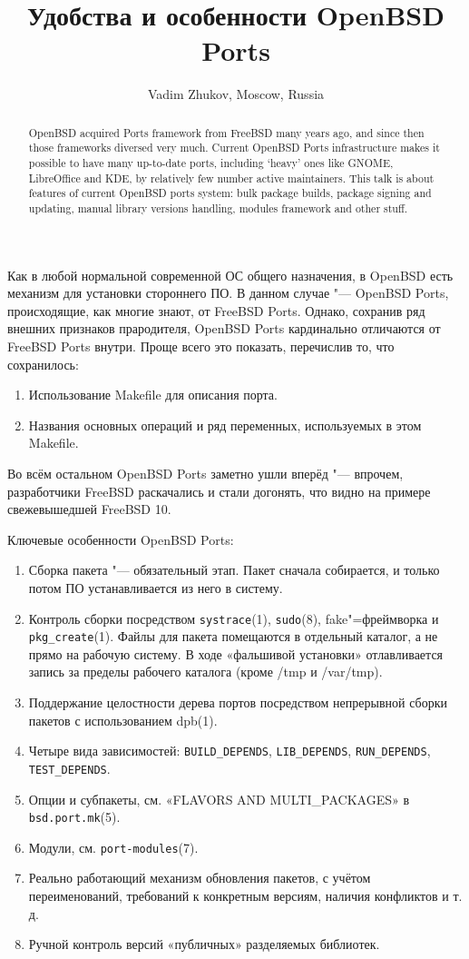 \documentclass[10pt, a5paper]{article}
\begin{document}
\def\v!#1!{\texttt{#1}}
\title{Удобства и особенности OpenBSD Ports}
\author{Vadim Zhukov, Moscow, Russia}
\maketitle
\begin{abstract}
OpenBSD acquired Ports framework from FreeBSD many years ago, and since then those frameworks diversed very much. Current OpenBSD Ports infrastructure makes it possible to have many up-to-date ports, including ‘heavy’ ones like GNOME, LibreOffice and KDE, by relatively few number active maintainers. This talk is about features of current OpenBSD ports system: bulk package builds, package signing and updating, manual library versions handling, modules framework and other stuff.
\end{abstract}
Как в любой нормальной современной ОС общего назначения, в OpenBSD есть механизм для установки стороннего ПО. В данном случае "--- OpenBSD Ports, происходящие, как многие знают, от FreeBSD Ports. Однако, сохранив ряд внешних признаков прародителя, OpenBSD Ports кардинально отличаются от FreeBSD Ports внутри. Проще всего это показать, перечислив то, что сохранилось:

\begin{enumerate}
  \item Использование Makefile для описания порта.
  \item Названия основных операций и ряд переменных, используемых в этом Makefile.
\end{enumerate}

Во всём остальном OpenBSD Ports заметно ушли вперёд "--- впрочем, разработчики FreeBSD раскачались и стали догонять, что видно на примере свежевышедшей FreeBSD 10.

Ключевые особенности OpenBSD Ports:

\begin{enumerate}
  \item Сборка пакета "--- обязательный этап. Пакет сначала собирается, и только потом ПО устанавливается из него в систему.
  \item Контроль сборки посредством \v!systrace!(1), \v!sudo!(8), fake"=фреймворка и \v!pkg\_create!(1). Файлы для пакета помещаются в отдельный каталог, а не прямо на рабочую систему. В ходе «фальшивой установки» отлавливается запись за пределы рабочего каталога (кроме /tmp и /var/tmp).
  \item Поддержание целостности дерева портов посредством непрерывной сборки пакетов с использованием dpb(1).
  \item Четыре вида зависимостей: \v!BUILD\_DEPENDS!, \v!LIB\_DE\-PENDS!, \v!RUN\_DEPENDS!, \v!TEST\_DEPENDS!.
  \item Опции и субпакеты, см. «FLAVORS AND MULTI\_PACKAGES» в \v!bsd.port.mk!(5).
  \item Модули, см. \v!port-modules!(7).
  \item Реально работающий механизм обновления пакетов, с учётом переименований, требований к конкретным версиям, наличия конфликтов и т.\,д.
  \item Ручной контроль версий «публичных» разделяемых библиотек.
\end{enumerate}
\end{document}
